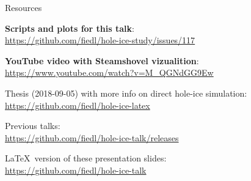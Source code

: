 
\begin{frame}{Resources}
  \begin{center}
    \textbf{Scripts and plots for this talk}: \\ \vspace{0.2cm}
    \url{https://github.com/fiedl/hole-ice-study/issues/117}

    \vspace{1cm}

    \textbf{YouTube video with Steamshovel vizualition}: \\ \vspace{0.2cm}
    \url{https://www.youtube.com/watch?v=M_QGNdGG9Ew}

    \vspace{1cm}

    Thesis (2018-09-05) with more info on direct hole-ice simulation: \\ \vspace{0.2cm}
    \url{https://github.com/fiedl/hole-ice-latex}

    \vspace{1cm}

    Previous talks: \\ \vspace{0.2cm}
    \url{https://github.com/fiedl/hole-ice-talk/releases}

    \vspace{1cm}

    \LaTeX\ version of these presentation slides: \\ \vspace{0.2cm}
    \url{https://github.com/fiedl/hole-ice-talk}
  \end{center}
\end{frame}

